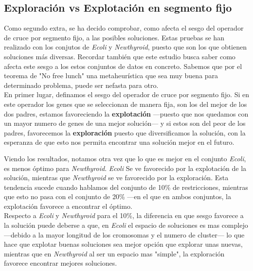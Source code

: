 \newpage
\subsection{Exploración vs Explotación en segmento fijo}
Como segundo extra, se ha decido comprobar, como afecta el sesgo del operador de cruce por segmento fijo, a las posibles soluciones. Estas pruebas se han realizado con los conjutos de \emph{Ecoli} y \emph{Newthyroid}, puesto que son los que obtienen soluciones más diversas. Recordar también que este estudio busca saber como afecta este sesgo a los estos conjuntos de datos en concreto. Sabemos que por el teorema de "No free lunch" una metaheurística que sea muy buena para determinado problema, puede ser nefasta para otro.\\
En primer lugar, definamos el sesgo del operador de cruce por segmento fijo. Si en este operador los genes que se seleccionan de manera fija, son los del mejor de los dos padres, estamos favoreciendo la \textbf{explotación} ---puesto que nos quedamos con un mayor numero de genes de una mejor solución--- y si estos son del peor de los padres, favorecemos la \textbf{exploración} puesto que diversificamos la solución, con la esperanza de que esto nos permita encontrar una solución mejor en el futuro.

Viendo los resultados, notamos otra vez que lo que es mejor en el conjunto \emph{Ecoli}, es menos óptimo para \emph{Newthyroid}. \emph{Ecoli} Se ve favorecido por la explotación de la solución, mientras que \emph{Newthyroid} se ve favorecido por la exploración. Esta tendencia sucede cuando hablamos del conjunto de 10\% de restricciones, mientras que esto no pasa con el conjunto de 20\% ---en el que en ambos conjuntos, la explotación favorece a encontrar el óptimo.\\
Respecto a \emph{Ecoli} y \emph{Newthyroid} para el 10\%, la diferencia en que sesgo favorece a la solución puede deberse a que, en \emph{Ecoli} el espacio de soluciones es mas complejo ---debido a la mayor longitud de los cromosomas y el numero de cluster--- lo que hace que explotar buenas soluciones sea mejor opción que explorar unas nuevas, mientras que en \emph{Newthyroid} al ser un espacio mas "simple", la exploración favorece encontrar mejores soluciones.


